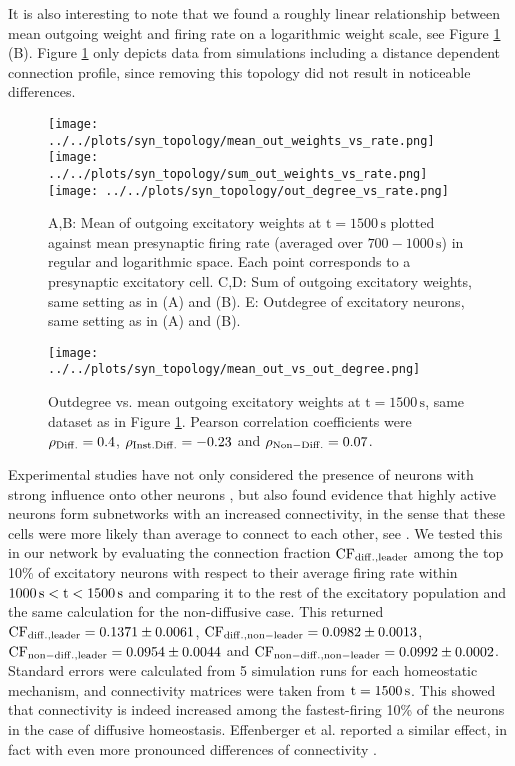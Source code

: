 \documentclass[10pt,a4paper]{article}
\begin{document}
It is also interesting to note that we found a roughly linear relationship between mean outgoing weight and firing rate on a logarithmic weight scale, see Figure \ref{Out_Weight_vs_F} (B). Figure \ref{Out_Weight_vs_F} only depicts data from simulations including a distance dependent connection profile, since removing this topology did not result in noticeable differences.

\begin{figure}
\texttt{[image: ../../plots/syn\_topology/mean\_out\_weights\_vs\_rate.png]}
\texttt{[image: ../../plots/syn\_topology/sum\_out\_weights\_vs\_rate.png]}
\texttt{[image: ../../plots/syn\_topology/out\_degree\_vs\_rate.png]}
\caption[Mean, sum and outdegree of outgoing excitatory weights plotted against mean presynaptic firing rate]{A,B: Mean of outgoing excitatory weights at $\mathrm{t=1500\,s}$ plotted against mean presynaptic firing rate (averaged over $\mathrm{700-1000\,s}$) in regular and logarithmic space. Each point corresponds to a presynaptic excitatory cell. C,D: Sum of outgoing excitatory weights, same setting as in (A) and (B). E: Outdegree of excitatory neurons, same setting as in (A) and (B).
}
\label{Out_Weight_vs_F}
\end{figure}

\begin{figure}
\texttt{[image: ../../plots/syn\_topology/mean\_out\_vs\_out\_degree.png]}
\caption[Outdegree vs. mean outgoing excitatory weights]{Outdegree vs. mean outgoing excitatory weights at $\mathrm{t=1500\,s}$, same dataset as in Figure \ref{Out_Weight_vs_F}. Pearson correlation coefficients were $\rho_{\rm Diff.} =  0.4$, $\rho_{\rm Inst. Diff.} =  -0.23$ and $\rho_{\rm Non-Diff.} =  0.07$.}
\label{Mean_Weight_vs_Out_Degree}
\end{figure}

Experimental studies have not only considered the presence of neurons with strong influence onto other neurons \cite{Eckmann_Leader_Neurons_2008}, but also found evidence that highly active neurons form subnetworks with an increased connectivity, in the sense that these cells were more likely than average to connect to each other, see \cite{Yassin_Subnetworks_2010}. We tested this in our network by evaluating the connection fraction $\rm CF_{diff.,leader}$ among the top 10\% of excitatory neurons with respect to their average firing rate within $\rm 1000\,s < t < 1500\,s$ and comparing it to the rest of the excitatory population and the same calculation for the non-diffusive case. This returned $\rm CF_{diff.,leader} = 0.1371 \pm 0.0061$, $\rm CF_{diff.,non-leader} = 0.0982 \pm 0.0013$, $\rm CF_{non-diff.,leader} = 0.0954 \pm 0.0044$ and $\rm CF_{non-diff.,non-leader} = 0.0992 \pm 0.0002$. Standard errors were calculated from 5 simulation runs for each homeostatic mechanism, and connectivity matrices were taken from $\rm t = 1500\,s$. This showed that connectivity is indeed increased among the fastest-firing 10\% of the neurons in the case of diffusive homeostasis. Effenberger et al. reported a similar effect, in fact with even more pronounced differences of connectivity \cite{Effenberger_2015}. 
\end{document}
